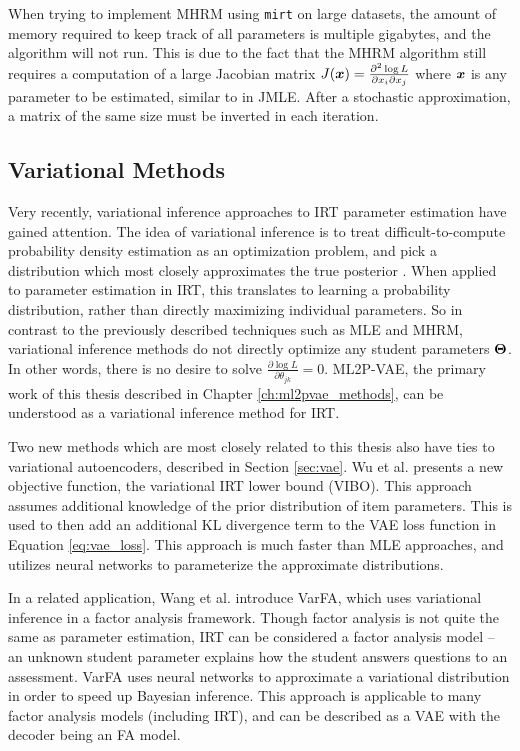 When trying to implement MHRM using \verb!mirt! on large datasets, the amount of memory required to keep track of all parameters is multiple gigabytes, and the algorithm will not run. This is due to the fact that the MHRM algorithm still requires a computation of a large Jacobian matrix $J(\boldsymbol{x}) = \frac{\partial^2 \log L}{\partial x_i \partial x_j}$ where $\boldsymbol{x}$ is any parameter to be estimated, similar to in JMLE. After a stochastic approximation, a matrix of the same size must be inverted in each iteration. 

\subsection{Variational Methods}
Very recently, variational inference approaches to IRT parameter estimation have gained attention. The idea of variational inference is to treat difficult-to-compute probability density estimation as an optimization problem, and pick a distribution which most closely approximates the true posterior \cite{Blei2017}. When applied to parameter estimation in IRT, this translates to learning a probability distribution, rather than directly maximizing individual parameters. So in contrast to the previously described techniques such as MLE and MHRM, variational inference methods do not directly optimize any student parameters $\boldsymbol{\Theta}$. In other words, there is no desire to solve $\frac{\partial \log L}{\partial \theta_{jk}} = 0$. ML2P-VAE, the primary work of this thesis described in Chapter \ref{ch:ml2pvae_methods}, can be understood as a variational inference method for IRT.

Two new methods which are most closely related to this thesis also have ties to variational autoencoders, described in Section \ref{sec:vae}. Wu et al. \cite{wu2020} presents a new objective function, the variational IRT lower bound (VIBO). This approach assumes additional knowledge of the prior distribution of item parameters. This is used to then add an additional KL divergence term to the VAE loss function in Equation \ref{eq:vae_loss}. This approach is much faster than MLE approaches, and utilizes neural networks to parameterize the approximate distributions.

In a related application, Wang et al. \cite{wang2020} introduce VarFA, which uses variational inference in a factor analysis framework. Though factor analysis is not quite the same as parameter estimation, IRT can be considered a factor analysis model -- an unknown student parameter explains how the student answers questions to an assessment. VarFA uses neural networks to approximate a variational distribution in order to speed up Bayesian inference. This approach is applicable to many factor analysis models (including IRT), and can be described as a VAE with the decoder being an FA model.


